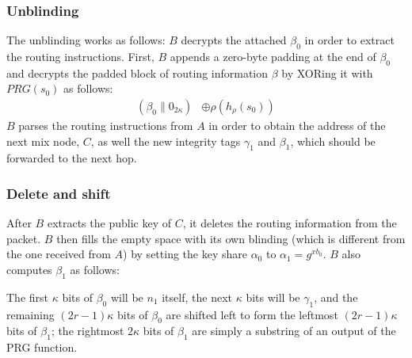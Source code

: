 \subsubsection{Unblinding}
The unblinding works as follows: $B$ decrypts the attached $\beta_0$ in order to extract the routing instructions. First, $B$ appends a zero-byte padding at the end of $\beta_0$ and decrypts the padded block of routing information $\beta$ by XORing it with $PRG(s_{0})$ as follows:
\begin{align}
    (\beta_0\|0_{2\kappa})&\oplus \rho(h_{\rho}(s_{0}))
\end{align}
$B$ parses the routing instructions from $A$ in order to obtain the address of the next mix node, $C$, as well the new integrity tags $\gamma_1$ and $\beta_1$, which should be forwarded to the next hop.

\subsubsection{Delete and shift}
After $B$ extracts the public key of $C$, it deletes the routing information from the packet. $B$ then fills the empty space with its own blinding (which is different from the one received from $A$) by setting the key share $\alpha_0$ to $\alpha_1=g^{xb_0}$. $B$ also computes $\beta_1$ as follows:

The first $\kappa$ bits of $\beta_0$ will be $n_{1}$ itself, the next $\kappa$ bits will be $\gamma_{1}$, and the remaining $(2r-1)\kappa$ bits of $\beta_0$ are shifted left to form the leftmost $(2r-1)\kappa$ bits of $\beta_{1}$; the rightmost $2\kappa$ bits of $\beta_{1}$ are simply a substring of an output of the PRG function.

